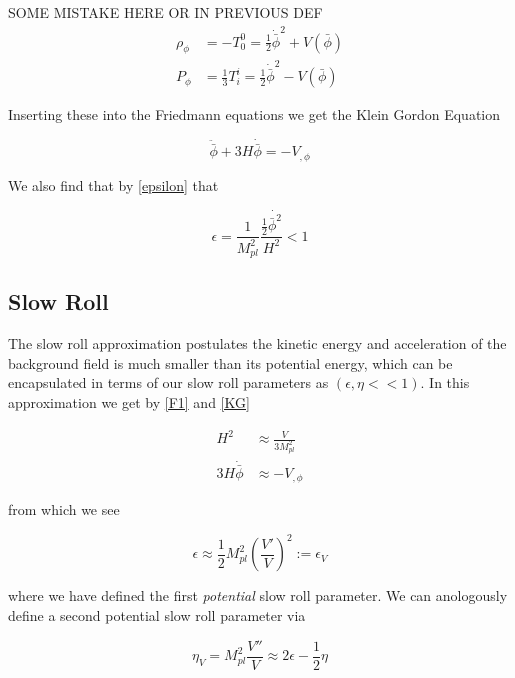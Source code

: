 \documentclass[a4paper,10pt]{article}
\newcommand{\Mp}{M_{pl}}
\newcommand{\half}{\frac{1}{2}}
\newcommand{\bphi}{\bar{\phi}}
\begin{document}
SOME MISTAKE HERE OR IN PREVIOUS DEF
\begin{equation}\begin{split}
\rho_\phi &=-T^0_0 = \half \dot{\bphi}^2+V(\bphi)\\
P_\phi&=\frac{1}{3}T^i_i = \half \dot{\bphi}^2-V(\bphi)
\end{split}\end{equation}

Inserting these into the Friedmann equations we get the Klein Gordon Equation

\begin{equation}
\tag{KG}
\label{KG}
\ddot{\bphi}+3H\dot{\bphi}=-V_{,\phi}
\end{equation}

We also find that by \ref{epsilon} that 

\begin{equation}
\epsilon = \frac{1}{\Mp^2}\frac{\half\dot{\bphi^2}}{H^2} < 1
\end{equation}

\subsection{Slow Roll}

The slow roll approximation postulates the kinetic energy and acceleration of the background field is much smaller than its potential energy, which can be encapsulated in terms of our slow roll parameters as $(\epsilon, \eta << 1)$. In this approximation we get by \ref{F1} and \ref{KG} 

\begin{equation}\begin{split}
H^2 &\approx \frac{V}{3\Mp^2} \\
3H\dot{\bphi} &\approx -V_{,\phi}
\end{split}\end{equation}

from which we see 

\begin{equation}
\epsilon \approx \half\Mp^2 (\frac{V'}{V})^2 := \epsilon_V
\end{equation}

where we have defined the first \textit{potential} slow roll parameter. We can anologously define a second potential slow roll parameter via

\begin{equation}
\eta_V = \Mp^2 \frac{V''}{V} \approx 2\epsilon - \half\eta
\end{equation}
\end{document}
